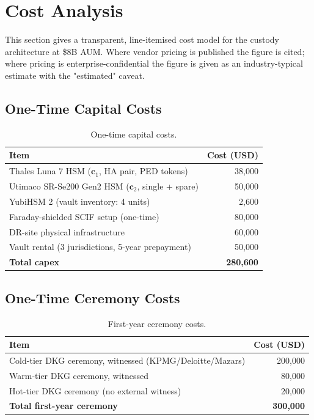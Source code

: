 \section{Cost Analysis}

\label{sec:cost}

This section gives a transparent, line-itemised cost model for the
custody architecture at \$8B AUM. Where vendor pricing is published
the figure is cited; where pricing is enterprise-confidential the
figure is given as an industry-typical estimate with the
"estimated" caveat.

\subsection{One-Time Capital Costs}

\begin{table}[h]
\centering
\small
\begin{tabular}{lr}
\toprule
\textbf{Item} & \textbf{Cost (USD)} \\
\midrule
Thales Luna 7 HSM ($\mathbf{c}_1$, HA pair, PED tokens) & 38{,}000 \\
Utimaco SR-Se200 Gen2 HSM ($\mathbf{c}_2$, single + spare) & 50{,}000 \\
YubiHSM 2 (vault inventory: 4 units) & 2{,}600 \\
Faraday-shielded SCIF setup (one-time) & 80{,}000 \\
DR-site physical infrastructure & 60{,}000 \\
Vault rental (3 jurisdictions, 5-year prepayment) & 50{,}000 \\
\textbf{Total capex} & \textbf{280{,}600} \\
\bottomrule
\end{tabular}
\caption{One-time capital costs.}
\label{tab:capex}
\end{table}

\subsection{One-Time Ceremony Costs}

\begin{table}[h]
\centering
\small
\begin{tabular}{lr}
\toprule
\textbf{Item} & \textbf{Cost (USD)} \\
\midrule
Cold-tier DKG ceremony, witnessed (KPMG/Deloitte/Mazars) & 200{,}000 \\
Warm-tier DKG ceremony, witnessed & 80{,}000 \\
Hot-tier DKG ceremony (no external witness) & 20{,}000 \\
\textbf{Total first-year ceremony} & \textbf{300{,}000} \\
\bottomrule
\end{tabular}
\caption{First-year ceremony costs.}
\label{tab:ceremony-cost}
\end{table}

